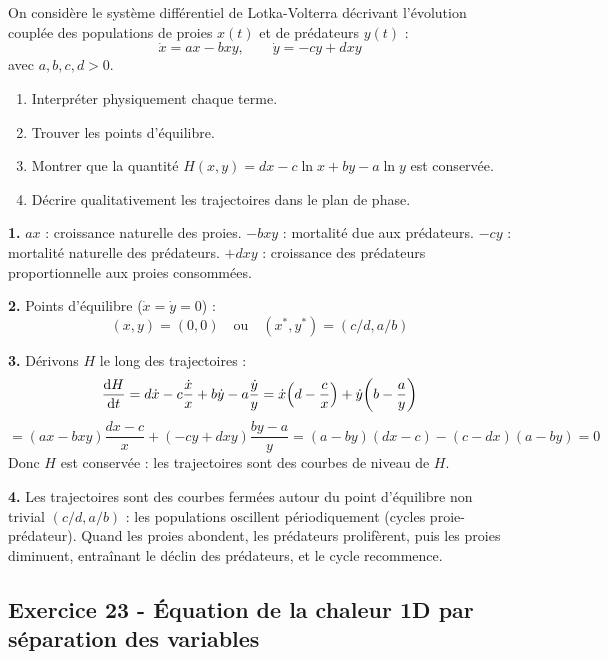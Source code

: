 \documentclass[12pt,a4paper]{article}
\begin{document}
\begin{boiteexercice}
On considère le système différentiel de Lotka-Volterra décrivant l'évolution couplée des populations de proies $x(t)$ et de prédateurs $y(t)$ :
\[
\dot x = ax - bxy, \qquad \dot y = -cy + dxy
\]
avec $a, b, c, d > 0$.
\begin{enumerate}
  \item Interpréter physiquement chaque terme.
  \item Trouver les points d'équilibre.
  \item Montrer que la quantité $H(x,y) = dx - c\ln x + by - a\ln y$ est conservée.
  \item Décrire qualitativement les trajectoires dans le plan de phase.
\end{enumerate}
\end{boiteexercice}

\begin{boitecorrige}
\textbf{1.} $ax$ : croissance naturelle des proies. $-bxy$ : mortalité due aux prédateurs. $-cy$ : mortalité naturelle des prédateurs. $+dxy$ : croissance des prédateurs proportionnelle aux proies consommées.

\textbf{2.} Points d'équilibre ($\dot x = \dot y = 0$) :
\[
(x, y) = (0, 0) \quad\text{ou}\quad (x^*, y^*) = (c/d, a/b)
\]

\textbf{3.} Dérivons $H$ le long des trajectoires :
\[
\frac{\mathrm{d} H}{\mathrm{d} t} = d\dot x - c\frac{\dot x}{x} + b\dot y - a\frac{\dot y}{y}
= \dot x\!\left(d - \frac{c}{x}\right) + \dot y\!\left(b - \frac{a}{y}\right)
\]
\[
= (ax - bxy)\frac{dx-c}{x} + (-cy+dxy)\frac{by-a}{y} = (a-by)(dx-c) - (c-dx)(a-by) = 0
\]
Donc $H$ est conservée : les trajectoires sont des courbes de niveau de $H$.

\textbf{4.} Les trajectoires sont des courbes fermées autour du point d'équilibre non trivial $(c/d, a/b)$ : les populations oscillent périodiquement (cycles proie-prédateur). Quand les proies abondent, les prédateurs prolifèrent, puis les proies diminuent, entraînant le déclin des prédateurs, et le cycle recommence.
\end{boitecorrige}

\subsection*{Exercice 23 - Équation de la chaleur 1D par séparation des variables \niveau{\difficile}}
\end{document}

